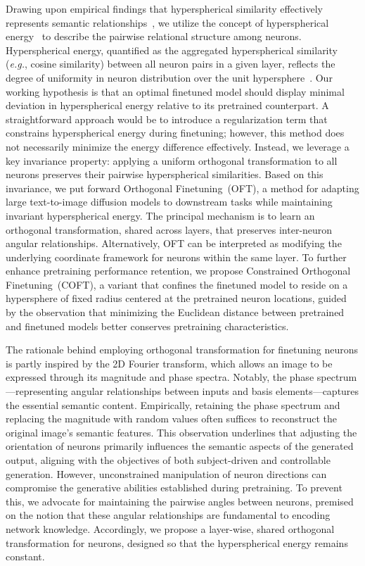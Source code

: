 Drawing upon empirical findings that hyperspherical similarity effectively represents semantic relationships~\cite{liu2017deep,liu2018decoupled,chen2020angular}, we utilize the concept of hyperspherical energy~\cite{liu2018learning} to describe the pairwise relational structure among neurons. Hyperspherical energy, quantified as the aggregated hyperspherical similarity (\emph{e.g.}, cosine similarity) between all neuron pairs in a given layer, reflects the degree of uniformity in neuron distribution over the unit hypersphere~\cite{liu2021learning}. Our working hypothesis is that an optimal finetuned model should display minimal deviation in hyperspherical energy relative to its pretrained counterpart. A straightforward approach would be to introduce a regularization term that constrains hyperspherical energy during finetuning; however, this method does not necessarily minimize the energy difference effectively. Instead, we leverage a key invariance property: applying a uniform orthogonal transformation to all neurons preserves their pairwise hyperspherical similarities. Based on this invariance, we put forward Orthogonal Finetuning~(OFT), a method for adapting large text-to-image diffusion models to downstream tasks while maintaining invariant hyperspherical energy. The principal mechanism is to learn an orthogonal transformation, shared across layers, that preserves inter-neuron angular relationships. Alternatively, OFT can be interpreted as modifying the underlying coordinate framework for neurons within the same layer. To further enhance pretraining performance retention, we propose Constrained Orthogonal Finetuning~(COFT), a variant that confines the finetuned model to reside on a hypersphere of fixed radius centered at the pretrained neuron locations, guided by the observation that minimizing the Euclidean distance between pretrained and finetuned models better conserves pretraining characteristics.

The rationale behind employing orthogonal transformation for finetuning neurons is partly inspired by the 2D Fourier transform, which allows an image to be expressed through its magnitude and phase spectra. Notably, the phase spectrum—representing angular relationships between inputs and basis elements—captures the essential semantic content. Empirically, retaining the phase spectrum and replacing the magnitude with random values often suffices to reconstruct the original image’s semantic features. This observation underlines that adjusting the orientation of neurons primarily influences the semantic aspects of the generated output, aligning with the objectives of both subject-driven and controllable generation. However, unconstrained manipulation of neuron directions can compromise the generative abilities established during pretraining. To prevent this, we advocate for maintaining the pairwise angles between neurons, premised on the notion that these angular relationships are fundamental to encoding network knowledge. Accordingly, we propose a layer-wise, shared orthogonal transformation for neurons, designed so that the hyperspherical energy remains constant.


